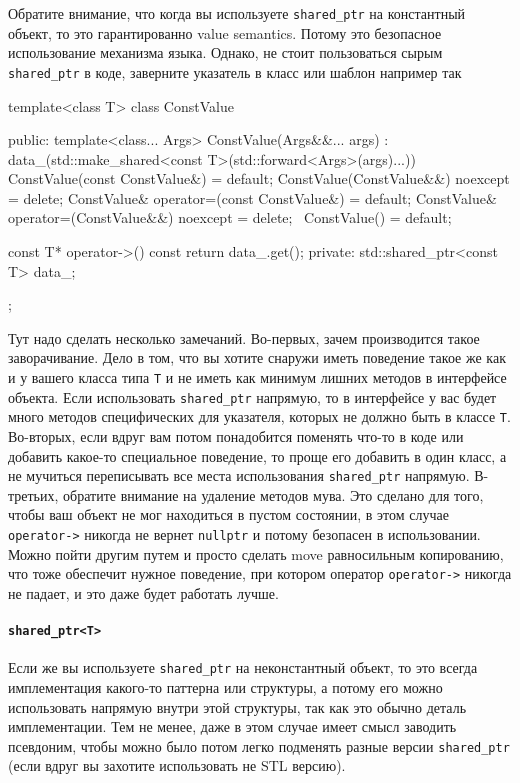 Обратите внимание, что когда вы используете \texttt{shared\_ptr} на константный объект, то это гарантированно value semantics.
Потому это безопасное использование механизма языка.
Однако, не стоит пользоваться сырым \texttt{shared\_ptr} в коде, заверните указатель в класс или шаблон например так
\begin{cppcode}
template<class T>
class ConstValue {
public:
  template<class... Args>
  ConstValue(Args&&... args)
   : data_(std::make_shared<const T>(std::forward<Args>(args)...)) {}
  ConstValue(const ConstValue&) = default;
  ConstValue(ConstValue&&) noexcept = delete;
  ConstValue& operator=(const ConstValue&) = default;
  ConstValue& operator=(ConstValue&&) noexcept = delete;
  ~ConstValue() = default;
  
  const T* operator->() const {
    return data_.get();
  }
private:
  std::shared_ptr<const T> data_;
};
\end{cppcode}
Тут надо сделать несколько замечаний.
Во-первых, зачем производится такое заворачивание.
Дело в том, что вы хотите снаружи иметь поведение такое же как и у вашего класса типа \texttt{T} и не иметь как минимум лишних методов в интерфейсе объекта.
Если использовать \texttt{shared\_ptr} напрямую, то в интерфейсе у вас будет много методов специфических для указателя, которых не должно быть в классе \texttt{T}.
Во-вторых, если вдруг вам потом понадобится поменять что-то в коде или добавить какое-то специальное поведение, то проще его добавить в один класс, а не мучиться переписывать все места использования \texttt{shared\_ptr} напрямую.
В-третьих, обратите внимание на удаление методов мува.
Это сделано для того, чтобы ваш объект не мог находиться в пустом состоянии, в этом случае \texttt{operator->} никогда не вернет \texttt{nullptr} и потому безопасен в использовании.
Можно пойти другим путем и просто сделать move равносильным копированию, что тоже обеспечит нужное поведение, при котором оператор \texttt{operator->} никогда не падает, и это даже будет работать лучше.

\paragraph{\texttt{shared\_ptr<T>}}

Если же вы используете \texttt{shared\_ptr} на неконстантный объект, то это всегда имплементация какого-то паттерна или структуры, а потому его можно использовать напрямую внутри этой структуры, так как это обычно деталь имплементации.
Тем не менее, даже в этом случае имеет смысл заводить псевдоним, чтобы можно было потом легко подменять разные версии \texttt{shared\_ptr} (если вдруг вы захотите использовать не STL версию).

